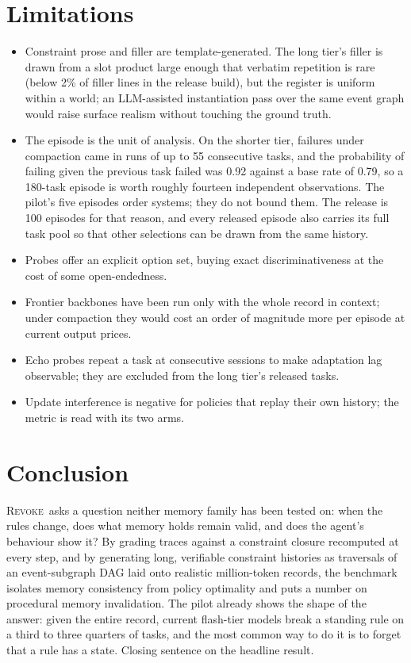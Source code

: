 \documentclass{article} %
\newcommand{\ph}[1]{#1}
\newcommand{\ph}[1]{\colorbox{phbg}{\textcolor{phfg}{\small\texttt{#1}}}}
\newcommand{\revoke}{\textsc{Revoke}}
\begin{document}
\section{Limitations}
\label{sec:limitations}
\begin{itemize}[leftmargin=*]
\item Constraint prose and filler are template-generated. The long tier's filler is drawn from a slot product large enough that verbatim repetition is rare (below 2\% of filler lines in the release build), but the register is uniform within a world; an LLM-assisted instantiation pass over the same event graph would raise surface realism without touching the ground truth.
\item The episode is the unit of analysis. On the shorter tier, failures under compaction came in runs of up to 55 consecutive tasks, and the probability of failing given the previous task failed was 0.92 against a base rate of 0.79, so a 180-task episode is worth roughly fourteen independent observations. The pilot's five episodes order systems; they do not bound them. The release is 100 episodes for that reason, and every released episode also carries its full task pool so that other selections can be drawn from the same history.
\item Probes offer an explicit option set, buying exact discriminativeness at the cost of some open-endedness.
\item Frontier backbones have been run only with the whole record in context; under compaction they would cost an order of magnitude more per episode at current output prices.
\item Echo probes repeat a task at consecutive sessions to make adaptation lag observable; they are excluded from the long tier's released tasks.
\item Update interference is negative for policies that replay their own history; the metric is read with its two arms.
\end{itemize}

\section{Conclusion}
\revoke\ asks a question neither memory family has been tested on: when the rules change, does what memory holds remain valid, and does the agent's behaviour show it? By grading traces against a constraint closure recomputed at every step, and by generating long, verifiable constraint histories as traversals of an event-subgraph DAG laid onto realistic million-token records, the benchmark isolates memory consistency from policy optimality and puts a number on procedural memory invalidation. The pilot already shows the shape of the answer: given the entire record, current flash-tier models break a standing rule on a third to three quarters of tasks, and the most common way to do it is to forget that a rule has a state. \ph{Closing sentence on the headline result.}
\end{document}
